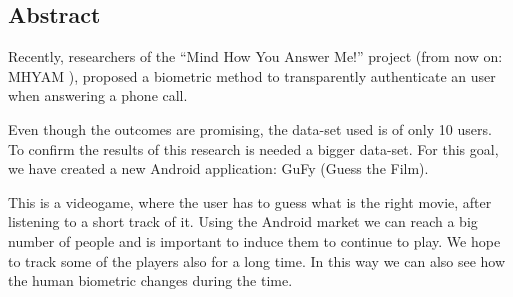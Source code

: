 
\def\PROJECT		{GuFy - Guess The Film} %
\def\SUBTITLE		{Collecting biometric measures through Gamification}

\def\AUTHOR			{\ME}

\def\TABLES		{false} %
\def\FIGURES	{true} %



\newpage
\thispagestyle{empty}
\mbox{}
\newpage

\newpage


\newpage
\thispagestyle{empty}
\mbox{}
\newpage

\hspace{1cm}
\begin{center}
\section*{Abstract}
\end{center}
Recently, researchers of the ``Mind How You Answer Me!'' project (from now on: MHYAM \cite{MHYAM}), proposed a biometric method to transparently authenticate an user when answering a phone call. 

Even though the outcomes are promising, the data-set used is of only 10 users. To confirm the results of this research is needed a bigger data-set. For this goal, we have created a new Android application: GuFy (Guess the Film). 

This is a videogame, where the user has to guess what is the right movie, after listening to a short track of it. Using the Android market we can reach a big number of people and is important to induce them to continue to play. We hope to track some of the players also for a long time. In this way we can also see how the human biometric changes during the time.

\newpage
\thispagestyle{empty}
\mbox{}
\newpage

